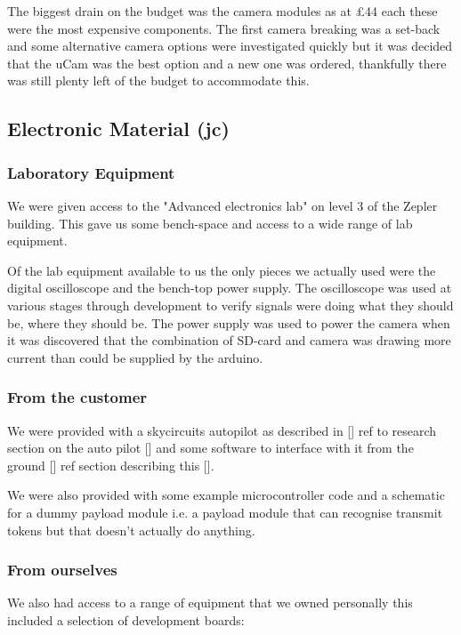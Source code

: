 The biggest drain on the budget was the camera modules as at \pounds 44 each these were the most expensive components. The first camera breaking was a set-back and some alternative camera options were investigated quickly but it was decided that the uCam was the best option and a new one was ordered, thankfully there was still plenty left of the budget to accommodate this.

\subsection{Electronic Material (jc)}

\subsubsection{Laboratory Equipment}

We were given access to the "Advanced electronics lab" on level 3 of the Zepler building. This gave us some bench-space and access to a wide range of lab equipment.

Of the lab equipment available to us the only pieces we actually used were the digital oscilloscope and the bench-top power supply. The oscilloscope was used at various stages through development to verify signals were doing what they should be, where they should be. The power supply was used to power the camera when it was discovered that the combination of SD-card and camera was drawing more current than could be supplied by the arduino.

\subsubsection{From the customer}

We were provided with a skycircuits autopilot \cite{SkyCircuits} as described in [] ref to research section on the auto pilot [] and some software to interface with it from the ground [] ref section describing this [].

We were also provided with some example microcontroller code and a schematic for a dummy payload module i.e. a payload module that can recognise transmit tokens but that doesn't actually do anything.

\subsubsection{From ourselves}

We also had access to a range of equipment that we owned personally this included a selection of development boards:

